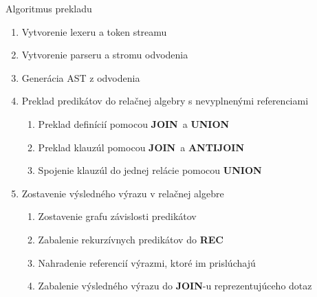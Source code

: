 \documentclass[11pt,aspectratio=169]{beamer}
\newcommand{\UNION}{\textbf{UNION}} \newcommand{\JOIN}{\textbf{JOIN}}
\newcommand{\ANTIJOIN}{\textbf{ANTIJOIN}} \newcommand{\REC}{\textbf{REC}}
\begin{document}
\begin{frame}{Algoritmus prekladu}
    \begin{enumerate}
    \item Vytvorenie lexeru a token streamu
    \item Vytvorenie parseru a stromu odvodenia
    \item Generácia AST z odvodenia
    \item Preklad predikátov do relačnej algebry s nevyplnenými referenciami
    \begin{enumerate}
        \item Preklad definícií pomocou \JOIN\ a \UNION\
        \item Preklad klauzúl pomocou \JOIN\ a \ANTIJOIN\
        \item Spojenie klauzúl do jednej relácie pomocou \UNION\
    \end{enumerate}
    \item Zostavenie výsledného výrazu v relačnej algebre
    \begin{enumerate}
        \item Zostavenie grafu závislosti predikátov
        \item Zabalenie rekurzívnych predikátov do \REC\
        \item Nahradenie referencií výrazmi, ktoré im prislúchajú
        \item Zabalenie výsledného výrazu do \JOIN-u reprezentujúceho dotaz
    \end{enumerate}
\end{enumerate}
\end{frame}
\end{document}
